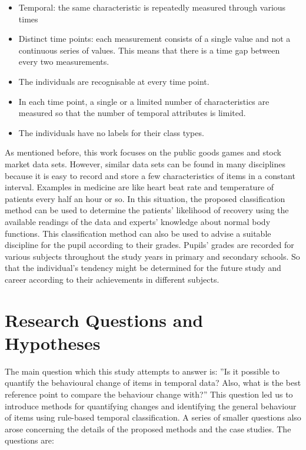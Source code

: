 \begin{itemize}
	\item  Temporal: the same characteristic is repeatedly measured through various times
	\item Distinct time points: each measurement consists of a single value and not a continuous series of values. This means that there is a time gap between every two measurements.
	\item The individuals are recognisable at every time point.
	\item In each time point, a single or a limited number of characteristics are measured so that the number of temporal attributes is limited.
	\item The individuals have no labels for their class types.
\end{itemize}


As mentioned before, this work focuses on the public goods games and stock market data sets. However, similar data sets can be found in many disciplines because it is easy to record and store a few characteristics of items in a constant interval. Examples in medicine are like heart beat rate and temperature of patients every half an hour or so. In this situation, the proposed classification method can be used to determine the patients’ likelihood of recovery using the available readings of the data and experts' knowledge about normal body functions. This classification method can also be used to advise a suitable discipline for the pupil according to their grades. Pupils’ grades are recorded for various subjects throughout the study years in primary and secondary schools. So that the individual's tendency might be determined for the future study and career according to their achievements in different subjects.

\section{Research Questions and Hypotheses}

The main question which this study attempts to answer is: ''Is it possible to quantify the behavioural change of items in temporal data? Also, what is the best reference point to compare the behaviour change with?'' This question led us to introduce methods for quantifying changes and identifying the general behaviour of items using rule-based temporal classification. A series of smaller questions also arose concerning the details of the proposed methods and the case studies. The questions are:


